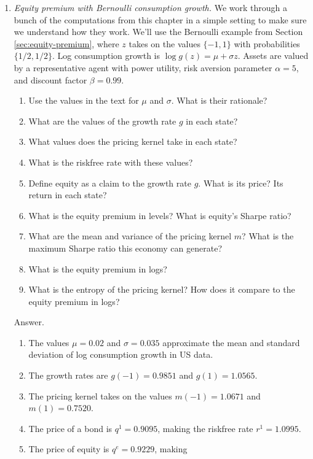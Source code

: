 \documentclass[11pt]{article}
\begin{document}
\begin{enumerate}

\item {\it Equity premium with Bernoulli consumption growth.\/}
We work through a bunch of the computations from this chapter
in a simple setting to make sure we understand how they work.
We'll use the Bernoulli example from Section \ref{sec:equity-premium},
where  $ z $  takes on the values $\{-1, 1\}$ with probabilities $\{ 1/2, 1/2 \}$.
Log consumption growth is $ \log g(z) = \mu + \sigma z$.
Assets are valued by a representative agent with power utility,
risk aversion parameter $\alpha = 5$, and discount factor $\beta = 0.99$.

\begin{enumerate}
\item Use the values in the text for $\mu$ and $\sigma$.
What is their rationale?
\item What are the values of the growth rate $g$ in each state?
\item What values does the pricing kernel take in each state?
\item What is the riskfree rate with these values?
\item Define equity as a claim to the growth rate $g$.
What is its price?
Its return in each state?
\item What is the equity premium in levels?
What is equity's Sharpe ratio?
\item What are the mean and variance of the pricing kernel $m$?
What is the maximum Sharpe ratio this economy can generate?
\item What is the equity premium in logs?
\item What is the entropy of the pricing kernel?
How does it compare to the equity premium in logs?
\end{enumerate}
%
Answer.
\begin{enumerate}
\item The values $\mu = 0.02$ and $\sigma = 0.035$ approximate
the mean and standard deviation of log consumption growth in US data.
\item The growth rates are $ g(-1) =  0.9851 $ and $g(1) = 1.0565 $.
\item The pricing kernel takes on the values
$ m(-1) = 1.0671$ and $m(1) = 0.7520 $.
\item The price of a bond is $q^1 = 0.9095$, making the riskfree rate
$ r^1 = 1.0995 $.
\item The price of equity is $ q^e =  0.9229$, making

\end{enumerate}
\end{enumerate}
\end{document}
